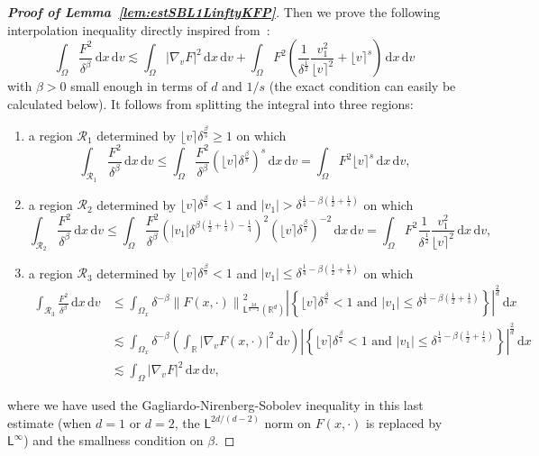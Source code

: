 \documentclass[11pt]{amsart}
\theoremstyle{definition}
\theoremstyle{remark}
\numberwithin{equation}{section}
\newcommand\R{{\mathbb R}}
\newcommand{\dd}{{\, \mathrm d}}
\newcommand{\sfL}{\mathsf{L}}
\newcommand{\wangle}[1]{\lfloor #1 \rceil}
\begin{document}
\begin{proof}[{\bf Proof of Lemma~\ref{lem:estSBL1LinftyKFP}}]
Then we prove the following interpolation inequality directly inspired from~\cite[Lemma~4.2]{carrapatoso2024KR}:
\begin{equation}
  \label{eq:EstimL2poids}
  \int_{\Omega}  \frac{F^2}{\delta^{\beta}} \dd x \dd v \lesssim
  \int_{\Omega} |\nabla_v F|^2 \dd x \dd v + \int_{\Omega} F^2 \left(  \frac{1}{\delta^{\frac{1}{2}}} \frac{v_1^2}{\wangle{v}^2}   +   \wangle{v}^s \right) \dd x \dd v
\end{equation}
with $\beta>0$ small enough in terms of $d$ and $1/s$ (the exact condition can easily be calculated below). It follows from splitting the integral into three regions:
\begin{enumerate}
\item a region $\mathcal{R}_1$ determined by $\wangle{v} \delta^{\frac{\beta}{s}} \ge 1$ on which
  \begin{equation*}
    \int_{\mathcal{R}_1} \frac{F^2}{\delta^{\beta}} \dd x \dd v \le \int_{\Omega}  \frac{F^2}{\delta^{\beta}} \left( \wangle{v} \delta^{\frac{\beta}{s}} \right)^s \dd x \dd v = \int_{\Omega} F^2 \wangle{v}^s \dd x \dd v,
  \end{equation*}
\item a region $\mathcal{R}_2$ determined by $\wangle{v} \delta^{\frac{\beta}{s}} < 1$ and $|v_1| > \delta^{\frac{1}{4}-\beta(\frac{1}{2}+\frac{1}{s})}$ on which
  \begin{equation*}
    \int_{\mathcal{R}_2}  \frac{F^2}{\delta^{\beta}} \dd x \dd v \le \int_{\Omega} \frac{F^2}{\delta^{\beta}} \left( |v_1| \delta^{\beta(\frac{1}{2}+\frac{1}{s})-\frac{1}{4}} \right)^2 \left( \wangle{v} \delta^{\frac{\beta}{s}} \right)^{-2} \dd x \dd v = \int_{\Omega} F^2 \frac{1}{\delta^{\frac{1}{2}}} \frac{v_1^2}{\wangle{v}^2} \dd x \dd v,
  \end{equation*}
\item a region $\mathcal{R}_3$ determined by $\wangle{v} \delta^{\frac{\beta}{s}} < 1$ and $|v_1| \le \delta^{\frac{1}{4}-\beta(\frac{1}{2}+\frac{1}{s})}$ on which
  \begin{align*}
    \int_{\mathcal{R}_3}  \frac{F^2}{\delta^{\beta}} \dd x \dd v
    & \le \int_{\Omega_x} \delta^{-\beta} \left\| F(x,\cdot) \right\|_{\sfL^{\frac{2d}{d-2}}(\R^d)}^2   \left| \left\{ \wangle{v} \delta^{\frac{\beta}{s}} < 1 \text{ and } |v_1| \le \delta^{\frac{1}{4}-\beta(\frac{1}{2}+\frac{1}{s})} \right\} \right|^{\frac{2}{d}} \dd x \\
    & \lesssim \int_{\Omega_x}  \delta^{-\beta} \left( \int_{\R} \big|\nabla_v F(x,\cdot)\big|^2 \dd v \right) \left| \left\{ \wangle{v} \delta^{\frac{\beta}{s}} < 1 \text{ and } |v_1| \le \delta^{\frac{1}{4}-\beta(\frac{1}{2}+\frac{1}{s})} \right\} \right|^{\frac{2}{d}} \dd x \\
    & \lesssim \int_{\Omega}  \big|\nabla_v F\big|^2 \dd x \dd v,
  \end{align*}
\end{enumerate}
where we have used the Gagliardo-Nirenberg-Sobolev inequality in this last estimate (when $d=1$ or $d=2$, the $\sfL^{2d/(d-2)}$ norm on $F(x,\cdot)$ is replaced by $\sfL^\infty$) and the smallness condition on $\beta$.


\end{proof}
\end{document}

